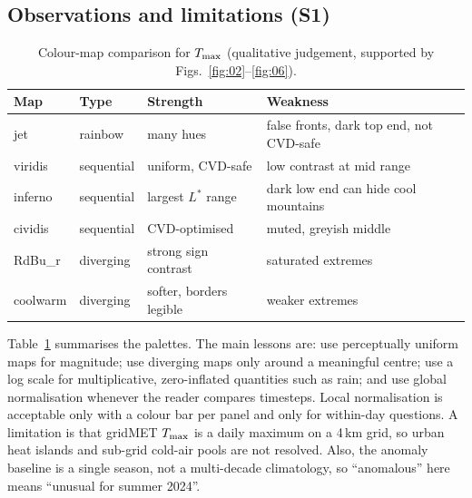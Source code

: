 \subsection{Observations and limitations (S1)}
\begin{table}[!t]
\centering
\caption{Colour-map comparison for $T_{\max}$ (qualitative judgement, supported by Figs.~\ref{fig:02}--\ref{fig:06}).}
\label{tab:cmapcomp}
\footnotesize
\begin{tabular}{p{1.4cm}p{1.2cm}p{2.2cm}p{2.3cm}}
\toprule
Map & Type & Strength & Weakness \\
\midrule
jet & rainbow & many hues & false fronts, dark top end, not CVD-safe \\
viridis & sequential & uniform, CVD-safe & low contrast at mid range \\
inferno & sequential & largest $L^*$ range & dark low end can hide cool mountains \\
cividis & sequential & CVD-optimised & muted, greyish middle \\
RdBu\_r & diverging & strong sign contrast & saturated extremes \\
coolwarm & diverging & softer, borders legible & weaker extremes \\
\bottomrule
\end{tabular}
\end{table}
Table~\ref{tab:cmapcomp} summarises the palettes. The main lessons are: use perceptually uniform maps for magnitude;
use diverging maps only around a meaningful centre; use a log scale for multiplicative, zero-inflated quantities such as
rain; and use global normalisation whenever the reader compares timesteps. Local normalisation is acceptable only with a
colour bar per panel and only for within-day questions. A limitation is that gridMET $T_{\max}$ is a daily maximum on a 4\,km
grid, so urban heat islands and sub-grid cold-air pools are not resolved. Also, the anomaly baseline is a single season,
not a multi-decade climatology, so ``anomalous'' here means ``unusual for summer 2024''.
